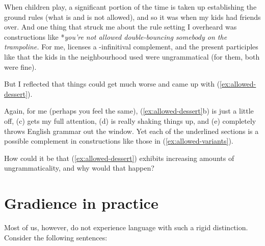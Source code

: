 When children play, a significant portion of the time is taken up establishing the ground rules (what is and is not allowed), and so it was when my kids had friends over. And one thing that struck me about the rule setting I overheard was constructions like *\textit{you're not allowed double-bouncing somebody on the trampoline.} For me,  licenses a -infinitival complement, and the present participles like  that the kids in the neighbourhood used were ungrammatical (for them, both were fine).

But I reflected that things could get much worse and came up with (\ref{ex:allowed-dessert}).

\ea \label{ex:allowed-dessert}
    \z
\z

Again, for me (perhaps you feel the same), (\ref{ex:allowed-dessert}b) is just a little off, (c) gets my full attention, (d) is really shaking things up, and (e) completely throws English grammar out the window. Yet each of the underlined sections is a possible complement in constructions like those in (\ref{ex:allowed-variants}).

\ea \label{ex:allowed-variants}
    \z
\z

How could it be that (\ref{ex:allowed-dessert}) exhibits increasing amounts of ungrammaticality, and why would that happen?


 

\section{Gradience in practice}
Most of us, however, do not experience language with such a rigid distinction. Consider the following sentences:

\ea \label{ex:dog-gradience}
 \z
\z

